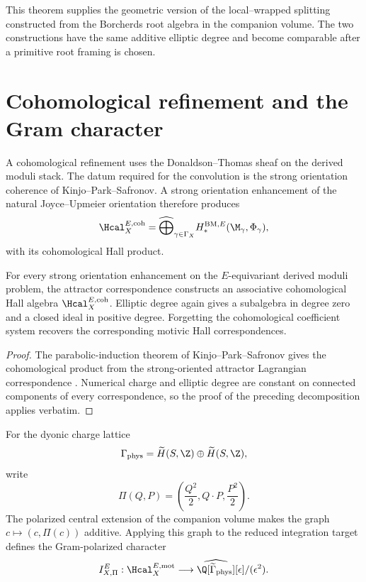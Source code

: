 This theorem supplies the geometric version of the local--wrapped splitting constructed from the Borcherds root algebra in the companion volume.  The two constructions have the same additive elliptic degree and become comparable after a primitive root framing is chosen.

\chapter{Cohomological refinement and the Gram character}
A cohomological refinement uses the Donaldson--Thomas sheaf on the derived moduli stack.  The datum required for the convolution is the strong orientation coherence of Kinjo--Park--Safronov.  A strong orientation enhancement of the natural Joyce--Upmeier orientation therefore produces
\[
 \Hcal_X^{E,\mathrm{coh}}
 =\widehat\bigoplus_{\gamma\in\Gamma_X}
 H_*^{\mathrm{BM},E}(\M_\gamma,\Phi_\gamma),
\]
with its cohomological Hall product.

\begin{theorem}
For every strong orientation enhancement on the $E$-equivariant derived moduli problem, the attractor correspondence constructs an associative cohomological Hall algebra $\Hcal_X^{E,\mathrm{coh}}$.  Elliptic degree again gives a subalgebra in degree zero and a closed ideal in positive degree.  Forgetting the cohomological coefficient system recovers the corresponding motivic Hall correspondences.
\end{theorem}
\begin{proof}
The parabolic-induction theorem of Kinjo--Park--Safronov gives the cohomological product from the strong-oriented attractor Lagrangian correspondence \cite{KPS}.  Numerical charge and elliptic degree are constant on connected components of every correspondence, so the proof of the preceding decomposition applies verbatim.
\end{proof}

For the dyonic charge lattice
\[
 \Gamma_{\mathrm{phys}}
 =\widetilde H(S,\Z)\oplus\widetilde H(S,\Z),
\]
write
\[
 \Pi(Q,P)=\left(\frac{Q^2}{2},Q\cdot P,\frac{P^2}{2}\right).
\]
The polarized central extension of the companion volume makes the graph $c\mapsto(c,\Pi(c))$ additive.  Applying this graph to the reduced integration target defines the Gram-polarized character
\[
 I_{X,\Pi}^E:
 \Hcal_X^{E,\mathrm{mot}}
 \longrightarrow
 \widehat{\Q[\widetilde\Gamma_{\mathrm{phys}}]}[\epsilon]/(\epsilon^2).
\]

